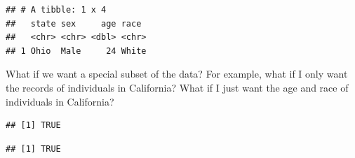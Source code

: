 \documentclass[]{book}
\newenvironment{Shaded}{\begin{snugshade}}{\end{snugshade}}
\newcommand{\KeywordTok}[1]{\textcolor[rgb]{0.13,0.29,0.53}{\textbf{#1}}}
\newcommand{\StringTok}[1]{\textcolor[rgb]{0.31,0.60,0.02}{#1}}
\newcommand{\CommentTok}[1]{\textcolor[rgb]{0.56,0.35,0.01}{\textit{#1}}}
\newcommand{\OperatorTok}[1]{\textcolor[rgb]{0.81,0.36,0.00}{\textbf{#1}}}
\newcommand{\NormalTok}[1]{#1}
\theoremstyle{definition}
\theoremstyle{definition}
\theoremstyle{definition}
\theoremstyle{remark}
\begin{document}
\begin{verbatim}
## # A tibble: 1 x 4
##   state sex     age race 
##   <chr> <chr> <dbl> <chr>
## 1 Ohio  Male     24 White
\end{verbatim}

What if we want a special subset of the data? For example, what if I
only want the records of individuals in California? What if I just want
the age and race of individuals in California?

\begin{Shaded}
\end{Shaded}

\begin{verbatim}
## [1] TRUE
\end{verbatim}

\begin{Shaded}
\end{Shaded}

\begin{verbatim}
## [1] TRUE
\end{verbatim}
\end{document}
